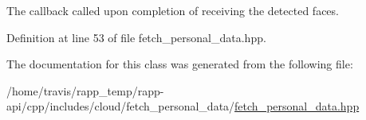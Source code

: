 The callback called upon completion of receiving the detected faces. 



Definition at line 53 of file fetch\-\_\-personal\-\_\-data.\-hpp.



The documentation for this class was generated from the following file\-:\begin{DoxyCompactItemize}
\item 
/home/travis/rapp\-\_\-temp/rapp-\/api/cpp/includes/cloud/fetch\-\_\-personal\-\_\-data/\hyperlink{fetch__personal__data_8hpp}{fetch\-\_\-personal\-\_\-data.\-hpp}\end{DoxyCompactItemize}
